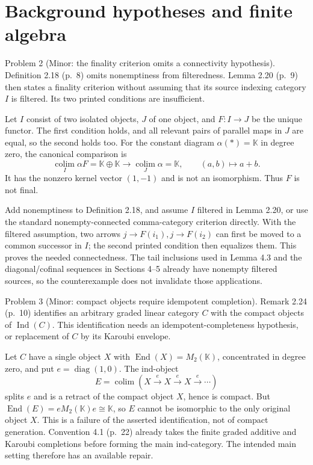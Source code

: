 \documentclass[10pt]{article}
\begin{document}
\section*{Background hypotheses and finite algebra}
Problem 2 (Minor: the finality criterion omits a connectivity hypothesis).  Definition 2.18 (p. 8) omits nonemptiness from filteredness. Lemma 2.20 (p. 9) then states a finality criterion without assuming that its source indexing category \(I\) is filtered. Its two printed conditions are insufficient.\par
Let \(I\) consist of two isolated objects, \(J\) of one object, and \(F:I\to J\) be the unique functor. The first condition holds, and all relevant pairs of parallel maps in \(J\) are equal, so the second holds too. For the constant diagram \(\alpha(*)=\mathbb K\) in degree zero, the canonical comparison is \[\operatorname*{colim}_{I}\alpha F=\mathbb K\oplus\mathbb K
 \longrightarrow \operatorname*{colim}_{J}\alpha=\mathbb K,
 \qquad (a,b)\longmapsto a+b.\] It has the nonzero kernel vector \((1,-1)\) and is not an isomorphism. Thus \(F\) is not final.\par
Add nonemptiness to Definition 2.18, and assume \(I\) filtered in Lemma 2.20, or use the standard nonempty-connected comma-category criterion directly. With the filtered assumption, two arrows \(j\to F(i_1),j\to F(i_2)\) can first be moved to a common successor in \(I\); the second printed condition then equalizes them. This proves the needed connectedness. The tail inclusions used in Lemma 4.3 and the diagonal/cofinal sequences in Sections 4–5 already have nonempty filtered sources, so the counterexample does not invalidate those applications.\par
Problem 3 (Minor: compact objects require idempotent completion).  Remark 2.24 (p. 10) identifies an arbitrary graded linear category \(C\) with the compact objects of \(\operatorname{Ind}(C)\). This identification needs an idempotent-completeness hypothesis, or replacement of \(C\) by its Karoubi envelope.\par
Let \(C\) have a single object \(X\) with \(\operatorname{End}(X)=M_2(\mathbb K)\), concentrated in degree zero, and put \(e=\operatorname{diag}(1,0)\). The ind-object \[E=\operatorname*{colim}(X\xrightarrow e X\xrightarrow e X
 \xrightarrow e\cdots)\] splits \(e\) and is a retract of the compact object \(X\), hence is compact. But \(\operatorname{End}(E)=eM_2(\mathbb K)e\cong\mathbb K\), so \(E\) cannot be isomorphic to the only original object \(X\). This is a failure of the asserted identification, not of compact generation. Convention 4.1 (p. 22) already takes the finite graded additive and Karoubi completions before forming the main ind-category. The intended main setting therefore has an available repair.\par
\end{document}
